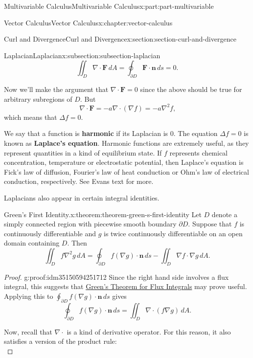 \documentclass[twoside,10pt,]{tufte-book}
\newcommand{\terminology}[1]{\textbf{#1}}
\numberwithin{equation}{part}
\newcommand{\grad}{\nabla}
\renewcommand{\div}{\nabla\cdot}
\newcommand{\del}{\nabla}
\newcommand{\vb}[1]{\mathbf{#1}}
\newcommand{\dn}{\cdot\vb{n}\,ds}
\begin{document}
\begin{partptx}{Multivariable Calculus}{}{Multivariable Calculus}{}{}{x:part:part-multivariable}
\begin{chapterptx}{Vector Calculus}{}{Vector Calculus}{}{}{x:chapter:vector-calculus}
\begin{sectionptx}{Curl and Divergence}{}{Curl and Divergence}{}{}{x:section:section-curl-and-divergence}
\begin{subsectionptx}{Laplacian}{}{Laplacian}{}{}{x:subsection:subsection-laplacian}
\begin{equation*}
\iint_{D}\div\vb{F}\,dA = \oint_{\partial D}\vb{F}\cdot\vb{n}\,ds = 0\text{.}
\end{equation*}
%
\par
Now we'll make the argument that \(\div\vb{F} = 0\) since the above should be true for arbitrary subregions of \(D\). But%
\begin{equation*}
\div\vb{F} = -a\div(\grad f) = -a\del^{2}f\text{,}
\end{equation*}
which means that \(\Delta f = 0\).%
\par
We say that a function is \terminology{harmonic} if its Laplacian is \(0\). The equation \(\Delta f = 0\) is known as \terminology{Laplace's equation}. Harmonic functions are extremely useful, as they represent quantities in a kind of equilibrium state. If \(f\) represents chemical concentration, temperature or electrostatic potential, then Laplace's equation is Fick's law of diffusion, Fourier's law of heat conduction or Ohm's law of electrical conduction, respectively. See Evans text for more.%
\par
Laplacians also appear in certain integral identities.%
\begin{theorem}{Green's First Identity.}{}{x:theorem:theorem-green-s-first-identity}%
%
Let \(D\) denote a simply connected region with piecewise smooth boundary \(\partial D\). Suppose that \(f\) is continuously differentiable and \(g\) is twice continuously differentiable on an open domain containing \(D\). Then%
\begin{equation*}
\iint_{D}f\del^{2}g\,dA = \oint_{\partial D}f(\grad g)\dn - \iint_{D}\grad f\cdot \grad g\,dA\text{.}
\end{equation*}
%
\end{theorem}
\begin{proof}{}{g:proof:idm35150594251712}
Since the right hand side involves a flux integral, this suggests that \hyperref[x:theorem:theorem-green-s-theorem-for-flux-integrals]{Green's Theorem for Flux Integrals} may prove useful. Applying this to \(\oint_{\partial D}f(\grad g)\dn\) gives%
\begin{equation*}
\oint_{\partial D}f(\grad g)\dn = \iint_{D}\div(f\grad g)\,dA\text{.}
\end{equation*}
%
\par
Now, recall that \(\div\) is a kind of derivative operator. For this reason, it also satisfies a version of the product rule:%
\begin{equation*}

\end{equation*}
\end{proof}
\end{subsectionptx}
\end{sectionptx}
\end{chapterptx}
\end{partptx}
\end{document}
